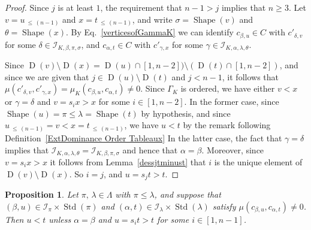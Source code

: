 \documentclass[10pt]{amsart}
\newtheorem{prop}[theo]{Proposition}
\theoremstyle{definition}
\newcommand{\Lessthan}[2]{#1\,{_{\leqslant\,#2}}}
\DeclareMathOperator{\STD}{Std}
\DeclareMathOperator{\shape}{Shape}
\DeclareMathOperator{\D}{D}
\begin{document}
\begin{proof}
Since $j$ is at least $1$, the requirement that $n-1>j$ implies that $n\geqslant 3$.
Let $v=\Lessthan u{(n-1)}$ and $x=\Lessthan t{(n-1)}$, and write
$\sigma=\shape(v)$ and $\theta=\shape(x)$. By Eq.~\eqref{verticesofGammaK} we can
identify $c_{\beta,u}\in C$ with
$c'_{\delta,v}$ for some $\delta\in\mathcal{I}_{K,\beta,\pi,\sigma}$, and
$c_{\alpha,t}\in C$ with $c'_{\gamma,x}$ for some
$\gamma\in\mathcal{I}_{K,\alpha,\lambda,\theta}$.

Since $\D(v)\setminus\D(x)=\D(u)\cap[1,n-2])\setminus(\D(t)\cap[1,n-2])$, and since we are
given that $j\in\D(u)\setminus\D(t)$ and $j<n-1$,
it follows that
$\mu(c'_{\delta,v},c'_{\gamma,x})=\mu_K(c_{\beta,u},c_{\alpha,t})\neq 0$.
Since $\Gamma_K$ is ordered, we have either $v<x$ or $\gamma=\delta$ and
$v=s_ix>x$ for some $i\in[1,n-2]$. In the former case, since
$\shape(u)=\pi\leqslant\lambda=\shape(t)$ by hypothesis, and
since $\Lessthan u{(n-1)}=v<x=\Lessthan t{(n-1)}$,
we have $u<t$ by the remark following Definition~\ref{ExtDominance Order Tableaux}
In the latter case, the fact that $\gamma=\delta$ implies that
$\mathcal{I}_{K,\alpha,\lambda,\theta}=\mathcal{I}_{K,\beta,\pi,\sigma}$
and hence that $\alpha=\beta$. Moreover, since $v=s_ix>x$ it follows
from Lemma~\ref{dessjtminust} that $i$ is the unique element of
$\D(v)\setminus\D(x)$. So $i=j$, and $u=s_jt>t$.
\end{proof}

\begin{prop}\label{kldominancesamenolecule}
Let $\pi,\,\lambda\in\Lambda$ with $\pi\leqslant\lambda$, and
suppose that $(\beta,u)\in\mathcal{I}_{\pi}\times\STD(\pi)$ and
$(\alpha,t)\in\mathcal{I}_{\lambda}\times\STD(\lambda)$ satisfy
$\mu(c_{\beta,u},c_{\alpha,t}) \neq 0$. Then $u < t$ unless
$\alpha = \beta$ and $u=s_i t>t$ for some $i\in[1,n-1]$.
\end{prop}
\end{document}
